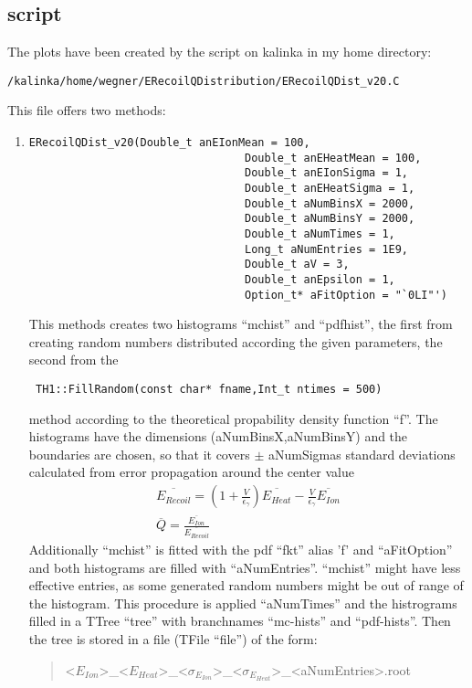 \documentclass[10pt, a4paper]{article}
\begin{document}
\subsection{script}
The plots have been created by the script on kalinka in my home directory:
\begin{verbatim}
/kalinka/home/wegner/ERecoilQDistribution/ERecoilQDist_v20.C
\end{verbatim}
This file offers two methods:
\begin{enumerate}
\item \begin{verbatim}
ERecoilQDist_v20(Double_t anEIonMean = 100,
								 Double_t anEHeatMean = 100,
								 Double_t anEIonSigma = 1,
								 Double_t anEHeatSigma = 1,
								 Double_t aNumBinsX = 2000,
								 Double_t aNumBinsY = 2000,
								 Double_t aNumTimes = 1,
								 Long_t aNumEntries = 1E9,
								 Double_t aV = 3,
								 Double_t anEpsilon = 1,
								 Option_t* aFitOption = "`0LI"')
\end{verbatim}
This methods creates two histograms "`mchist"' and "`pdfhist"', the first from creating random numbers distributed according the given parameters, the second from the \begin{verbatim} TH1::FillRandom(const char* fname,Int_t ntimes = 500) \end{verbatim} method according to the theoretical propability density function "`f"'. The histograms have the dimensions (aNumBinsX,aNumBinsY) and the boundaries are chosen, so that it covers $\pm$ aNumSigmas standard deviations calculated from error propagation around the center value
\begin{gather}
\overline{E_{Recoil}} = \left(1 + \frac{V}{\epsilon_\gamma} \right) \overline{E_{Heat}} - \frac{V}{\epsilon_\gamma} \overline{E_{Ion}} \\
\overline{Q} = \frac{\overline{E_{Ion}}}{\overline{E_{Recoil}}} 
\end{gather}
Additionally "`mchist"' is fitted with the pdf "`fkt"' alias 'f' and "`aFitOption"' and both histograms are filled with "`aNumEntries"'. "`mchist"' might have less effective entries, as some generated random numbers might be out of range of the histogram. This procedure is applied "`aNumTimes"' and the histrograms filled in a TTree "`tree"' with branchnames "`mc-hists"' and "`pdf-hists"'. Then the tree is stored in a file (TFile "`file"') of the form:
\begin{quote}
<$E_{Ion}$>\_<$E_{Heat}$>\_<$\sigma_{E_{Ion}}$>\_<$\sigma_{E_{Heat}}$>\_<aNumEntries>.root

\end{quote}
\end{enumerate}
\end{document}
